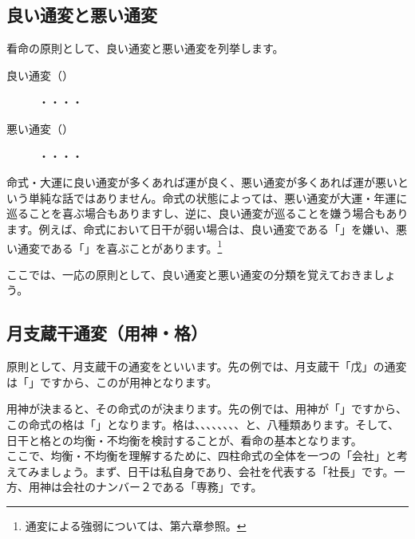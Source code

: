 \documentclass[a5paper,11pt,dvipdfmx]{tarticle}
\begin{document}
\subsection{良い通変と悪い通変}
看命の原則として、良い通変と悪い通変を列挙します。
\begin{description}
\item[良い通変（）] ・・・・
\item[悪い通変（）] ・・・・
\end{description}
  
命式・大運に良い通変が多くあれば運が良く、悪い通変が多くあれば運が悪いという単純な話ではありません。命式の状態によっては、悪い通変が大運・年運に巡ることを喜ぶ場合もありますし、逆に、良い通変が巡ることを嫌う場合もあります。例えば、命式において日干が弱い場合は、良い通変である「」を嫌い、悪い通変である「」を喜ぶことがあります。\footnote{通変による強弱については、第六章参照。}

ここでは、一応の原則として、良い通変と悪い通変の分類を覚えておきましょう。

\subsection{月支蔵干通変（用神・格）}

原則として、月支蔵干の通変をといいます。先の例では、月支蔵干「戊」の通変は「」ですから、このが用神となります。

用神が決まると、その命式のが決まります。先の例では、用神が「」ですから、この命式の格は「」となります。格は、、、、、、、、と、八種類あります。そして、日干と格との均衡・不均衡を検討することが、看命の基本となります。\\

ここで、均衡・不均衡を理解するために、四柱命式の全体を一つの「会社」と考えてみましょう。まず、日干は私自身であり、会社を代表する「社長」です。一方、用神は会社のナンバー２である「専務」です。
\end{document}
